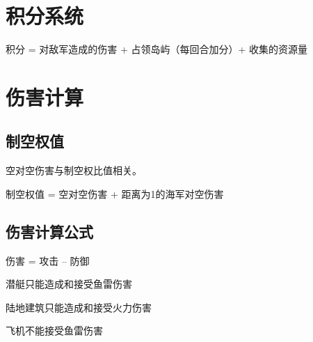 \documentclass[11pt,a4paper]{article}
\begin{document}
  \section{积分系统}
  \label{sec:积分系统}
    积分 = 对敌军造成的伤害 + 占领岛屿（每回合加分）+ 收集的资源量


  \section{伤害计算}
    \subsection{制空权值}
      空对空伤害与制空权比值相关。

      制空权值 = 空对空伤害 + 距离为1的海军对空伤害

    \subsection{伤害计算公式}
    伤害 = 攻击 – 防御

    潜艇只能造成和接受鱼雷伤害

    陆地建筑只能造成和接受火力伤害

    飞机不能接受鱼雷伤害
\end{document}
